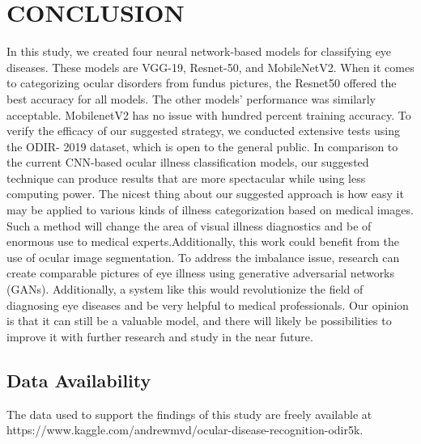 \chapter{CONCLUSION}

In this study, we created four neural network-based models for classifying eye diseases. These models are VGG-19, Resnet-50, and MobileNetV2. When it comes to categorizing ocular disorders from fundus pictures, the Resnet50 offered the best accuracy for all models. The other models' performance was similarly acceptable. MobilenetV2 has no issue with hundred percent training accuracy. To verify the efficacy of our suggested strategy, we conducted extensive tests using the ODIR- 2019 dataset, which is open to the general public. In comparison to the current CNN-based ocular illness classification models, our suggested technique can produce results that are more spectacular while using less computing power. The nicest thing about our suggested approach is how easy it may be applied to various kinds of illness categorization based on medical images. Such a method will change the area of visual illness diagnostics and be of enormous use to medical experts.Additionally, this work could benefit from the use of ocular image segmentation. To address the imbalance issue, research can create comparable pictures of eye illness using generative adversarial networks (GANs). Additionally, a system like this would revolutionize the field of diagnosing eye diseases and be very helpful to medical professionals. Our opinion is that it can still be a valuable model, and there will likely be possibilities to improve it with further research and study in the near future.

\section{Data Availability}
The data used to support the findings of this study are freely available at https://www.kaggle.com/andrewmvd/ocular-disease-recognition-odir5k.

